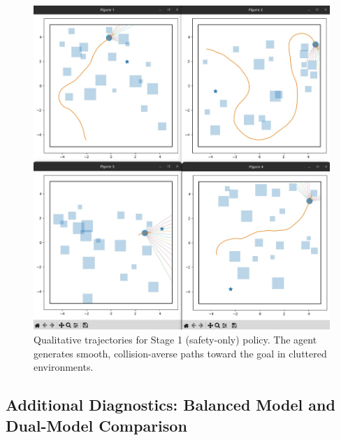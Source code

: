 \documentclass[10pt,conference]{IEEEtran}
\begin{document}
\begin{figure}[h!]
    \centering
    \includegraphics[width=\columnwidth]{images/safety_only.png}
    \caption{Qualitative trajectories for Stage 1 (safety-only) policy. The agent generates smooth, collision-averse paths toward the goal in cluttered environments.}
    \label{fig:safety_only}
\end{figure}

\subsection{Additional Diagnostics: Balanced Model and Dual-Model Comparison}
\end{document}
